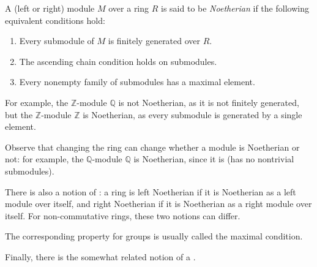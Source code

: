 \documentclass[12pt]{article}
\begin{document}

A (left or right) module $M$ over a ring $R$ is said to be \emph{Noetherian}
if the following equivalent conditions hold:
\begin{enumerate}
\item Every submodule of $M$ is finitely generated over $R$.
\item The ascending chain condition holds on submodules.
\item Every nonempty family of submodules has a maximal element.
\end{enumerate}

For example, the $\mathbb{Z}$-module $\mathbb{Q}$ is not Noetherian,
as it is not finitely generated,
but the $\mathbb{Z}$-module $\mathbb{Z}$ is Noetherian,
as every submodule is generated by a single element.

Observe that changing the ring can change whether a module is Noetherian or not:
for example, the $\mathbb{Q}$-module $\mathbb{Q}$ is Noetherian,
since it is 
(has no nontrivial submodules). 

There is also a notion of :
a ring is left Noetherian if it is Noetherian as a left module over itself,
and right Noetherian if it is Noetherian as a right module over itself.
For non-commutative rings, these two notions can differ.

The corresponding property for groups is usually called the maximal condition.

Finally, there is the somewhat related notion of a
.

\end{document}

